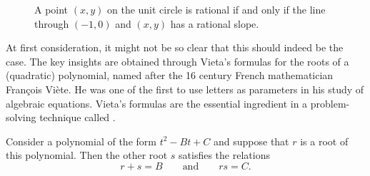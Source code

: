\begin{figure}[t]
  \begin{center}
  \end{center}
  \caption[Stereographic projection]{A point $(x,y)$ on the unit circle is rational if and only if the line through $(-1,0)$ and $(x,y)$ has a rational slope.}
  \label{figure:stereographic-projection}
\end{figure}

At first consideration, it might not be so clear that this should indeed be the case. The key insights are obtained through Vieta's formulas for the roots of a (quadratic) polynomial, named after the 16\supth{} century French mathematician Fran\c{c}ois Vi\`{e}te. He was one of the first to use letters as parameters in his study of algebraic equations. Vieta's formulas are the essential ingredient in a problem-solving technique called .

\begin{theorem}\label{theorem:vieta-formulas-quadratic}
  Consider a polynomial of the form $t^2-Bt+C$ and suppose that $r$ is a root of this polynomial. Then the other root $s$ satisfies the relations
  \begin{equation*}
    r+s=B\qquad\text{and}\qquad rs=C.
  \end{equation*}
\end{theorem}


